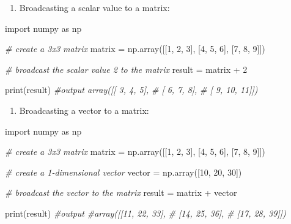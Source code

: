 \documentclass[11pt]{article}
\providecommand{\tightlist}{%
      \setlength{\itemsep}{0pt}\setlength{\parskip}{0pt}}
\newenvironment{Shaded}{}{}
\newcommand{\DecValTok}[1]{\textcolor[rgb]{0.25,0.63,0.44}{{#1}}}
\newcommand{\CommentTok}[1]{\textcolor[rgb]{0.38,0.63,0.69}{\textit{{#1}}}}
\newcommand{\NormalTok}[1]{{#1}}
\newcommand{\ImportTok}[1]{{#1}}
\newcommand{\OperatorTok}[1]{\textcolor[rgb]{0.40,0.40,0.40}{{#1}}}
\newcommand{\BuiltInTok}[1]{{#1}}
\begin{document}
\begin{enumerate}
\def\labelenumi{\arabic{enumi}.}
\tightlist
\item
  Broadcasting a scalar value to a matrix:
\end{enumerate}

\begin{Shaded}
\begin{Highlighting}[]
\ImportTok{import}\NormalTok{ numpy }\ImportTok{as}\NormalTok{ np}

\CommentTok{\# create a 3x3 matrix}
\NormalTok{matrix }\OperatorTok{=}\NormalTok{ np.array([[}\DecValTok{1}\NormalTok{, }\DecValTok{2}\NormalTok{, }\DecValTok{3}\NormalTok{], [}\DecValTok{4}\NormalTok{, }\DecValTok{5}\NormalTok{, }\DecValTok{6}\NormalTok{], [}\DecValTok{7}\NormalTok{, }\DecValTok{8}\NormalTok{, }\DecValTok{9}\NormalTok{]])}

\CommentTok{\# broadcast the scalar value 2 to the matrix}
\NormalTok{result }\OperatorTok{=}\NormalTok{ matrix }\OperatorTok{+} \DecValTok{2}

\BuiltInTok{print}\NormalTok{(result)}
\CommentTok{\#output array([[ 3,  4,  5],}
\CommentTok{\#              [ 6,  7,  8],}
\CommentTok{\#              [ 9, 10, 11]])}
\end{Highlighting}
\end{Shaded}

\begin{enumerate}
\def\labelenumi{\arabic{enumi}.}
\setcounter{enumi}{1}
\tightlist
\item
  Broadcasting a vector to a matrix:
\end{enumerate}

\begin{Shaded}
\begin{Highlighting}[]
\ImportTok{import}\NormalTok{ numpy }\ImportTok{as}\NormalTok{ np}

\CommentTok{\# create a 3x3 matrix}
\NormalTok{matrix }\OperatorTok{=}\NormalTok{ np.array([[}\DecValTok{1}\NormalTok{, }\DecValTok{2}\NormalTok{, }\DecValTok{3}\NormalTok{], [}\DecValTok{4}\NormalTok{, }\DecValTok{5}\NormalTok{, }\DecValTok{6}\NormalTok{], [}\DecValTok{7}\NormalTok{, }\DecValTok{8}\NormalTok{, }\DecValTok{9}\NormalTok{]])}

\CommentTok{\# create a 1{-}dimensional vector}
\NormalTok{vector }\OperatorTok{=}\NormalTok{ np.array([}\DecValTok{10}\NormalTok{, }\DecValTok{20}\NormalTok{, }\DecValTok{30}\NormalTok{])}

\CommentTok{\# broadcast the vector to the matrix}
\NormalTok{result }\OperatorTok{=}\NormalTok{ matrix }\OperatorTok{+}\NormalTok{ vector}

\BuiltInTok{print}\NormalTok{(result)}
\CommentTok{\#output}
\CommentTok{\#array([[11, 22, 33],}
\CommentTok{\#       [14, 25, 36],}
\CommentTok{\#       [17, 28, 39]])}
\end{Highlighting}
\end{Shaded}
\end{document}
